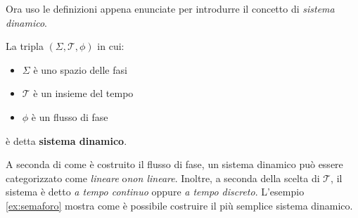 Ora uso le definizioni appena enunciate per introdurre il concetto di
\emph{sistema dinamico}.

\begin{definition}
    La tripla $(\Sigma, \mathcal T, \phi)$ in cui:
    \begin{itemize}
        \item $\Sigma$ è uno spazio delle fasi%
        \item $\mathcal T$ è un insieme del tempo%
        \item $\phi$ è un flusso di fase%
    \end{itemize}
    è detta \textbf{sistema dinamico}.
\end{definition}

A seconda di come è costruito il flusso di fase, un sistema dinamico
può essere categorizzato come \emph{lineare} o\emph{non lineare}.
Inoltre, a seconda della scelta di $\mathcal T$, il sistema è detto
\emph{a tempo continuo} oppure \emph{a tempo discreto}.
L'esempio \ref{ex:semaforo} mostra come è possibile costruire
il più semplice sistema dinamico.

